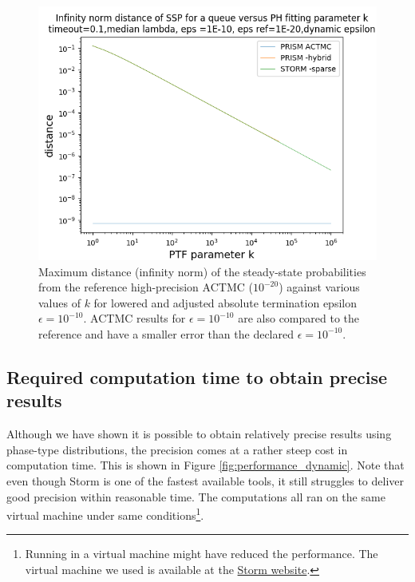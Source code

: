 \documentclass[paper=a4, fontsize=11pt]{scrartcl}
\numberwithin{equation}{section}		%
\numberwithin{figure}{section}			%
\numberwithin{table}{section}				%
\begin{document}
	\begin{figure}[H]
		\begin{center}
			\includegraphics[trim=0.2cm 0cm 0cm 1.35cm,width=15cm, clip]{picture/New_model/1E-10/distance_dynamic_1E-10.png}
		\end{center}
		\caption{Maximum distance (infinity norm) of the steady-state probabilities from the reference high-precision ACTMC ($10^{-20}$) against various values of $k$ for lowered and adjusted absolute termination epsilon $\epsilon = 10^{-10}$. ACTMC results for $\epsilon = 10^{-10}$ are also compared to the reference and have a smaller error than the declared $\epsilon = 10^{-10}$.}
		\label{fig:distance_dynamic_1E-10_constant_kappa}
	\end{figure}
	
	\subsection{Required computation time to obtain precise results}
	\label{S:2.4}
	
	Although we have shown it is possible to obtain relatively precise results using phase-type distributions, the precision comes at a rather steep cost in computation time. This is shown in Figure \ref{fig:performance_dynamic}. Note that even though Storm is one of the fastest available tools, it still struggles to deliver good precision within reasonable time. The computations all ran on the same virtual machine under same conditions\footnote{Running in a virtual machine might have reduced the performance. The virtual machine we used is available at the \href{http://www.stormchecker.org/documentation/vm/vm.html}{Storm website}.}.
	
\end{document}

